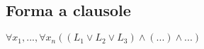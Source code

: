 \documentclass{article}
\begin{document}
\begin{multicols*}{3}
 		\subsection{Forma a clausole}
 		\(\forall x_1,..., \forall x_n ((L_1\lor L_2 \lor L_3)\land (...) \land  ...)\)
 		
	 	
	 	
		\end{multicols*}
		
		
		
		
		
\end{document}
